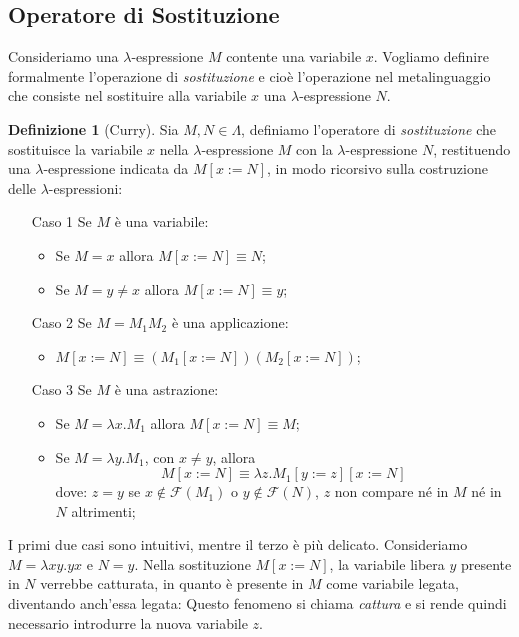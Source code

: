 \documentclass[a4paper,11pt]{article}
\theoremstyle{definition}
\newtheorem{defn}{Definizione}
\newcommand{\FF}{\mathcal{F}}
\begin{document}
\subsection{Operatore di Sostituzione}
Consideriamo una $\lambda$-espressione $M$ contente una variabile $x$.
Vogliamo definire formalmente l'operazione di \textit{sostituzione} e cioè l'operazione 
nel metalinguaggio che consiste nel sostituire alla variabile $x$ 
una $\lambda$-espressione $N$.

\begin{defn}[Curry]
  Sia $M,N\in\Lambda$, definiamo l'operatore di \textit{sostituzione} che
  sostituisce la variabile $x$ nella $\lambda$-espressione $M$ con la
  $\lambda$-espressione $N$, restituendo una $\lambda$-espressione indicata da
  $M[x:=N]$, in modo ricorsivo sulla costruzione delle $\lambda$-espressioni:
  \begin{itemize}
    \item[{Caso 1}] Se $M$ è una variabile:
      \begin{itemize}
        \item Se $M=x$ allora $M[x:=N]\equiv N$;
        \item Se $M=y\ne x$ allora $M[x:=N]\equiv y$;
      \end{itemize}
    \item[Caso 2] Se $M=M_1M_2$ è una applicazione:
      \begin{itemize}
        \item $M[x:=N]\equiv (M_1[x:=N])(M_2[x:=N])$; 
      \end{itemize}
    \item[Caso 3] Se $M$ è una astrazione:
      \begin{itemize}
        \item Se $M=\lambda x.M_1$ allora $M[x:=N] \equiv M$;
        \item Se $M =\lambda y.M_1$, con $x\ne y$, allora 
          \[
            M[x:=N] \equiv\lambda z.M_1[y:=z][x:=N]
          \]
          dove: $z=y$ se $x\not\in\FF(M_1)$ o
          $y\not\in \FF(N)$, $z$ non compare né in $M$ né in $N$ altrimenti;
      \end{itemize}
  \end{itemize}
\end{defn}
I primi due casi sono intuitivi, mentre il terzo è più delicato. Consideriamo
$M=\lambda xy.yx$ e $N=y$. Nella sostituzione $M[x:=N]$, la variabile libera 
$y$ presente in $N$ verrebbe catturata, in quanto è presente in $M$ come variabile legata, 
diventando anch'essa legata: Questo fenomeno si chiama \textit{cattura} e si rende quindi 
necessario introdurre la nuova variabile $z$.
\end{document}

